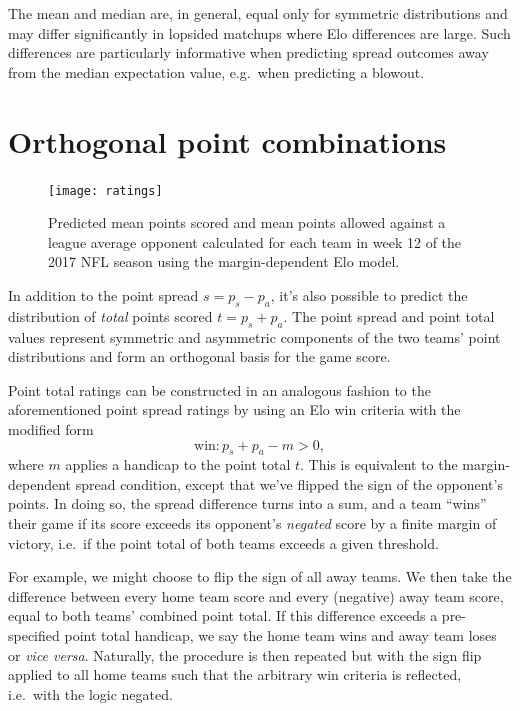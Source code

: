 \documentclass[aps,prc,reprint,amsmath,superscriptaddress,nofootinbib]{revtex4-1}
\begin{document}
The mean and median are, in general, equal only for symmetric distributions and may differ significantly in lopsided matchups where Elo differences are large.
Such differences are particularly informative when predicting spread outcomes away from the median expectation value, e.g.\ when predicting a blowout. 

\section{Orthogonal point combinations}

\begin{figure}
  \texttt{[image: ratings]}
  \caption{\label{fig:ratings} Predicted mean points scored and mean points allowed against a league average opponent calculated for each team in week 12 of the 2017 NFL season using the margin-dependent Elo model.}
\end{figure}

In addition to the point spread $s = p_s - p_a$, it's also possible to predict the distribution of \emph{total} points scored $t = p_s + p_a$.
The point spread and point total values represent symmetric and asymmetric components of the two teams' point distributions and form an orthogonal basis for the game score. 

Point total ratings can be constructed in an analogous fashion to the aforementioned point spread ratings by using an Elo win criteria with the modified form
\begin{equation}
  \label{win_total}
  \text{win}: p_s + p_a - m > 0,
\end{equation}
where $m$ applies a handicap to the point total $t$.
This is equivalent to the margin-dependent spread condition, except that we've flipped the sign of the opponent's points.
In doing so, the spread difference turns into a sum, and a team ``wins'' their game if its score exceeds its opponent's \emph{negated} score by a finite margin of victory, i.e.\ if the point total of both teams exceeds a given threshold.

For example, we might choose to flip the sign of all away teams.
We then take the difference between every home team score and every (negative) away team score, equal to both teams' combined point total.
If this difference exceeds a pre-specified point total handicap, we say the home team wins and away team loses or \emph{vice versa}.
Naturally, the procedure is then repeated but with the sign flip applied to all home teams such that the arbitrary win criteria is reflected, i.e.\ with the logic negated.
\end{document}
